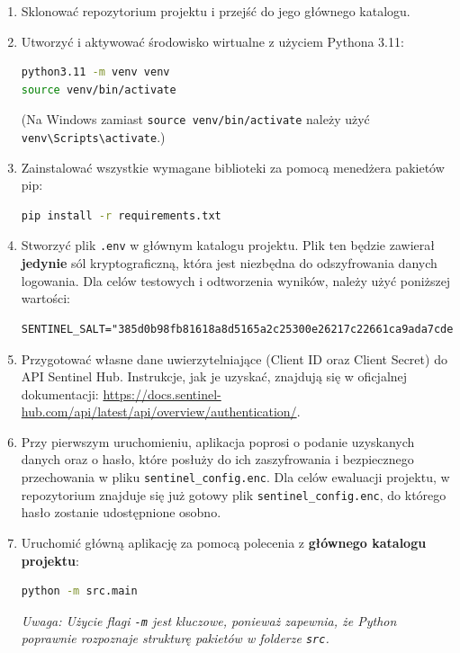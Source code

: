 \documentclass[12pt,a4paper]{article}
\begin{document}
\begin{enumerate}
    \item Sklonować repozytorium projektu i przejść do jego głównego katalogu.
    \item Utworzyć i aktywować środowisko wirtualne z użyciem Pythona 3.11:
    \begin{lstlisting}[language=bash]
python3.11 -m venv venv
source venv/bin/activate
    \end{lstlisting}
    (Na Windows zamiast \texttt{source venv/bin/activate} należy użyć \texttt{venv\textbackslash Scripts\textbackslash activate}.)
    \item Zainstalować wszystkie wymagane biblioteki za pomocą menedżera pakietów pip:
    \begin{lstlisting}[language=bash]
pip install -r requirements.txt
    \end{lstlisting}
    
    \item Stworzyć plik \texttt{.env} w głównym katalogu projektu. Plik ten będzie zawierał \textbf{jedynie} sól kryptograficzną, która jest niezbędna do odszyfrowania danych logowania. Dla celów testowych i odtworzenia wyników, należy użyć poniższej wartości:
    \begin{lstlisting}
SENTINEL_SALT="385d0b98fb81618a8d5165a2c25300e26217c22661ca9ada7cde877075184219"
    \end{lstlisting}
    
    \item Przygotować własne dane uwierzytelniające (Client ID oraz Client Secret) do API Sentinel Hub. Instrukcje, jak je uzyskać, znajdują się w oficjalnej dokumentacji: \url{https://docs.sentinel-hub.com/api/latest/api/overview/authentication/}.
    
    \item Przy pierwszym uruchomieniu, aplikacja poprosi o podanie uzyskanych danych oraz o hasło, które posłuży do ich zaszyfrowania i bezpiecznego przechowania w pliku \texttt{sentinel\_config.enc}. Dla celów ewaluacji projektu, w repozytorium znajduje się już gotowy plik \texttt{sentinel\_config.enc}, do którego hasło zostanie udostępnione osobno.
    
    \item Uruchomić główną aplikację za pomocą polecenia z \textbf{głównego katalogu projektu}:
    \begin{lstlisting}[language=bash]
python -m src.main
    \end{lstlisting}
    \textit{Uwaga: Użycie flagi \texttt{-m} jest kluczowe, ponieważ zapewnia, że Python poprawnie rozpoznaje strukturę pakietów w folderze \texttt{src}.}
\end{enumerate}
\end{document}
